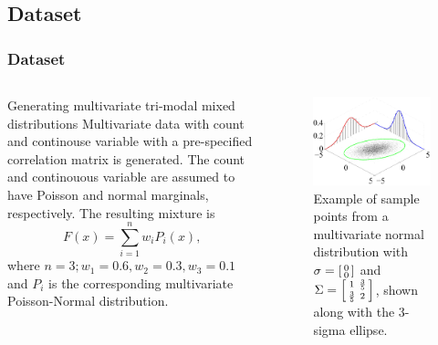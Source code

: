 \documentclass{beamer}\usepackage[]{graphicx}\usepackage[]{color}
\begin{document}
\subsection{Dataset}
\begin{frame}[fragile]
\frametitle{Dataset}
\small
\begin{columns}[c] %
\centering
\begin{block}{Generating multivariate tri-modal mixed distributions}
Multivariate data with count and continouse variable with a pre-specified correlation matrix is generated. The count and continouous variable are assumed to have Poisson and normal marginals, respectively. The resulting mixture is
\centering
\begin{equation*}
F(x) =  \sum_{i=1}^{n}  w_i P_i(x),
\end{equation*}
where $n = 3;w_1 = 0.6, w_2 = 0.3, w_3 = 0.1$ and $P_i$ is the corresponding multivariate Poisson-Normal distribution.
\end{block}
\centering
\begin{figure}
	\includegraphics[width=0.75\linewidth]{multivariate_normal_sample.png}
	\caption{\small Example of sample points from a multivariate normal distribution with $\sigma = \begin{bsmallmatrix} 0 \\ 0 \end{bsmallmatrix}$ and $\Sigma = \begin{bsmallmatrix}1 & \frac{3}{5}\\ \frac{3}{5} & 2\end{bsmallmatrix}$, shown along with the 3-sigma ellipse.\footnotemark}
\end{figure}
\end{columns}
\end{frame}
\end{document}
